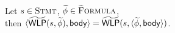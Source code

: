 \documentclass {llncs}
\begin{document}
\begin{lemma}\label{lemma:gvlrp-wlp-defs-equiv}~\\
Let $s \in \setStmt$, $\gphi \in \setGFormula$, \\

\noindent then $\langle \gWP(s, \gphi), \bodyBare \rangle = \gWP(s, \langle \gphi, \bodyBare \rangle)$.
\end{lemma}

%
\end{document}
